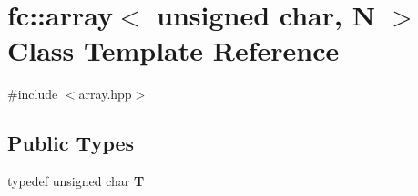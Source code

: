 \hypertarget{classfc_1_1array_3_01unsigned_01char_00_01_n_01_4}{}\section{fc\+:\+:array$<$ unsigned char, N $>$ Class Template Reference}
\label{classfc_1_1array_3_01unsigned_01char_00_01_n_01_4}


{\ttfamily \#include $<$array.\+hpp$>$}

\subsection*{Public Types}
\begin{DoxyCompactItemize}
\item 
\mbox{\label{classfc_1_1array_3_01unsigned_01char_00_01_n_01_4_ac0bfc3c52803fe47b2a623ce88c67640}} 
typedef unsigned char {\bfseries T}
\end{DoxyCompactItemize}
